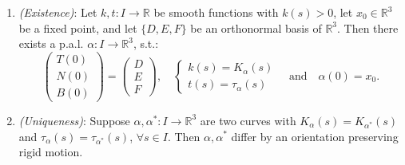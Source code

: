 \begin{enumerate}
\item \textit{(Existence)}: Let $k, t: I\to\mathbb{R}$ be smooth functions with $k(s) > 0$, let $x_0\in\mathbb{R}^3$ be a fixed point, and let $\{D, E, F\}$ be an orthonormal basis of $\mathbb{R}^3$. Then there exists a p.a.l. $\alpha: I\to\mathbb{R}^3$, s.t.:
\[
\begin{pmatrix}T(0)\\ N(0)\\ B(0)\end{pmatrix} = \begin{pmatrix}D\\ E\\ F\end{pmatrix}, \quad
\begin{cases}
k(s) = K_\alpha(s)\\
t(s) = \tau_\alpha(s)
\end{cases}
\quad\text{and}\quad \alpha(0) = x_0.
\]
\item \textit{(Uniqueness)}: Suppose $\alpha, \alpha^*: I\to\mathbb{R}^3$ are two curves with $K_\alpha(s) = K_{\alpha^*}(s)$ and $\tau_\alpha(s) = \tau_{\alpha^*}(s)$, $\forall s\in I$. Then $\alpha, \alpha^*$ differ by an orientation preserving rigid motion.
\end{enumerate}

